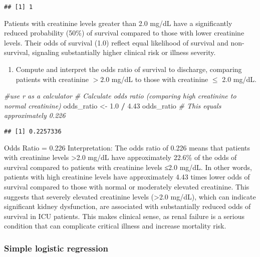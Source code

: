\documentclass[
]{article}
\newenvironment{Shaded}{\begin{snugshade}}{\end{snugshade}}
\newcommand{\CommentTok}[1]{\textcolor[rgb]{0.56,0.35,0.01}{\textit{#1}}}
\newcommand{\FloatTok}[1]{\textcolor[rgb]{0.00,0.00,0.81}{#1}}
\newcommand{\NormalTok}[1]{#1}
\newcommand{\OtherTok}[1]{\textcolor[rgb]{0.56,0.35,0.01}{#1}}
\newcommand{\SpecialCharTok}[1]{\textcolor[rgb]{0.81,0.36,0.00}{\textbf{#1}}}
\providecommand{\tightlist}{%
  \setlength{\itemsep}{0pt}\setlength{\parskip}{0pt}}
\begin{document}
\begin{verbatim}
## [1] 1
\end{verbatim}

Patients with creatinine levels greater than 2.0 mg/dL have a
significantly reduced probability (50\%) of survival compared to those
with lower creatinine levels. Their odds of survival (1.0) reflect equal
likelihood of survival and non-survival, signaling substantially higher
clinical risk or illness severity.

\begin{enumerate}
\def\labelenumi{\alph{enumi})}
\setcounter{enumi}{2}
\tightlist
\item
  Compute and interpret the odds ratio of survival to discharge,
  comparing patients with creatinine \(> 2.0\) mg/dL to those with
  creatinine \(\leq\) 2.0 mg/dL.
\end{enumerate}

\begin{Shaded}
\begin{Highlighting}[]
\CommentTok{\#use r as a calculator}
\CommentTok{\# Calculate odds ratio (comparing high creatinine to normal creatinine)}
\NormalTok{odds\_ratio }\OtherTok{\textless{}{-}} \FloatTok{1.0} \SpecialCharTok{/} \FloatTok{4.43}
\NormalTok{odds\_ratio  }\CommentTok{\# This equals approximately 0.226}
\end{Highlighting}
\end{Shaded}

\begin{verbatim}
## [1] 0.2257336
\end{verbatim}

Odds Ratio = 0.226 Interpretation: The odds ratio of 0.226 means that
patients with creatinine levels \textgreater2.0 mg/dL have approximately
22.6\% of the odds of survival compared to patients with creatinine
levels ≤2.0 mg/dL. In other words, patients with high creatinine levels
have approximately 4.43 times lower odds of survival compared to those
with normal or moderately elevated creatinine. This suggests that
severely elevated creatinine levels (\textgreater2.0 mg/dL), which can
indicate significant kidney dysfunction, are associated with
substantially reduced odds of survival in ICU patients. This makes
clinical sense, as renal failure is a serious condition that can
complicate critical illness and increase mortality risk.

\subsubsection{Simple logistic
regression}\label{simple-logistic-regression}
\end{document}

